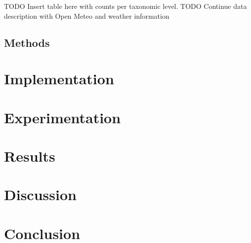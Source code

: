 \documentclass[conference]{IEEEtran}
\begin{document}
    TODO Insert table here with counts per taxonomic level.
    TODO Continue data description with Open Meteo and weather information
    
    \subsection{Methods}

\section{Implementation}

\section{Experimentation}

\section{Results}

\section{Discussion}

\section{Conclusion}




\end{document}
